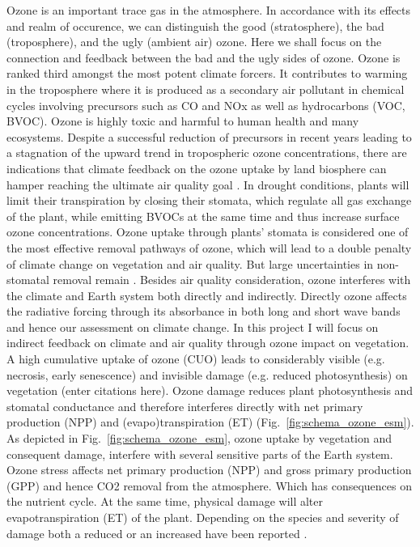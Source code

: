 Ozone is an important trace gas in the atmosphere. In accordance with its effects and realm of occurence, we can distinguish the good (stratosphere), the bad (troposphere), and the ugly (ambient air) ozone. Here we shall focus on the connection and feedback between the bad and the ugly sides of ozone. Ozone is ranked third amongst the most potent climate forcers. It contributes to warming in the troposphere where it is produced as a secondary air pollutant in chemical cycles involving precursors such as CO and NOx as well as hydrocarbons (VOC, BVOC). Ozone is highly toxic and harmful to human health and many ecosystems. Despite a successful reduction of precursors in recent years leading to a stagnation of the upward trend in tropospheric ozone concentrations, there are indications that climate feedback on the ozone uptake by land biosphere can hamper reaching the ultimate air quality goal \parencite{NCC:Lin2020}. In drought conditions, plants will limit their transpiration by closing their stomata, which regulate all gas exchange of the plant, while emitting BVOCs at the same time and thus increase surface ozone concentrations. Ozone uptake through plants’ stomata is considered one of the most effective removal pathways of ozone, which will lead to a double penalty of climate change on vegetation and air quality. But large uncertainties in non-stomatal removal remain \parencite{RG:Clifton2020}.
Besides air quality consideration, ozone interferes with the climate and Earth system both directly and indirectly. Directly ozone affects the radiative forcing through its absorbance in both long and short wave bands and hence our assessment on climate change. In this project I will focus on indirect feedback on climate and air quality through ozone impact on vegetation. A high cumulative uptake of ozone (CUO) leads to considerably visible (e.g. necrosis, early senescence) and invisible damage (e.g. reduced photosynthesis) on vegetation (enter citations here). Ozone damage reduces plant photosynthesis and stomatal conductance and therefore interferes directly with net primary production (NPP) and (evapo)transpiration (ET) (Fig.~\ref{fig:schema_ozone_esm}). As depicted in Fig.~\ref{fig:schema_ozone_esm}, ozone uptake by vegetation and consequent damage, interfere with several sensitive parts of the Earth system. Ozone stress affects net primary production (NPP) and gross primary production (GPP) and hence CO2 removal from the atmosphere. Which has consequences on the nutrient cycle. At the same time, physical damage will alter evapotranspiration (ET) of the plant. Depending on the species and severity of damage both a reduced or an increased have been reported \parencite{SR:Hoshika2015}. 
